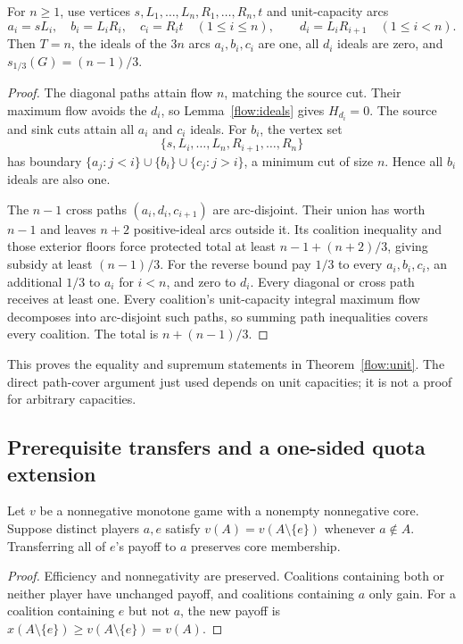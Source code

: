 \begin{proposition}\label{flow:chain}
For $n\ge1$, use vertices $s,L_1,\ldots,L_n,R_1,\ldots,R_n,t$ and
unit-capacity arcs
\[
 a_i=sL_i,\quad b_i=L_iR_i,\quad c_i=R_it\quad(1\le i\le n),
 \qquad d_i=L_iR_{i+1}\quad(1\le i<n).
\]
Then $T=n$, the ideals of the $3n$ arcs $a_i,b_i,c_i$ are one, all
$d_i$ ideals are zero, and $s_{1/3}(G)=(n-1)/3$.
\end{proposition}
\begin{proof}
The diagonal paths attain flow $n$, matching the source cut. Their
maximum flow avoids the $d_i$, so Lemma~\ref{flow:ideals} gives
$H_{d_i}=0$. The source and sink cuts attain all $a_i$ and $c_i$ ideals.
For $b_i$, the vertex set
\[
           \{s,L_i,\ldots,L_n,R_{i+1},\ldots,R_n\}
\]
has boundary $\{a_j:j<i\}\cup\{b_i\}\cup\{c_j:j>i\}$, a minimum
cut of size $n$. Hence all $b_i$ ideals are also one.

The $n-1$ cross paths $(a_i,d_i,c_{i+1})$ are arc-disjoint. Their union
has worth $n-1$ and leaves $n+2$ positive-ideal arcs outside it. Its
coalition inequality and those exterior floors force protected total at
least $n-1+(n+2)/3$, giving subsidy at least $(n-1)/3$.
For the reverse bound pay $1/3$ to every $a_i,b_i,c_i$, an additional
$1/3$ to $a_i$ for $i<n$, and zero to $d_i$. Every diagonal or cross
path receives at least one. Every coalition's unit-capacity integral
maximum flow decomposes into arc-disjoint such paths, so summing path
inequalities covers every coalition. The total is $n+(n-1)/3$.
\end{proof}
This proves the equality and supremum statements in
Theorem~\ref{flow:unit}. The direct path-cover argument just used depends
on unit capacities; it is not a proof for arbitrary capacities.

\subsection{Prerequisite transfers and a one-sided quota extension}
\begin{lemma}\label{flow:transfer}
Let $v$ be a nonnegative monotone game with a nonempty nonnegative core.
Suppose distinct players $a,e$ satisfy
$v(A)=v(A\setminus\{e\})$ whenever $a\notin A$. Transferring all of
$e$'s payoff to $a$ preserves core membership.
\end{lemma}
\begin{proof}
Efficiency and nonnegativity are preserved. Coalitions containing both
or neither player have unchanged payoff, and coalitions containing $a$
only gain. For a coalition containing $e$ but not $a$, the new payoff is
$x(A\setminus\{e\})\ge v(A\setminus\{e\})=v(A)$.
\end{proof}

